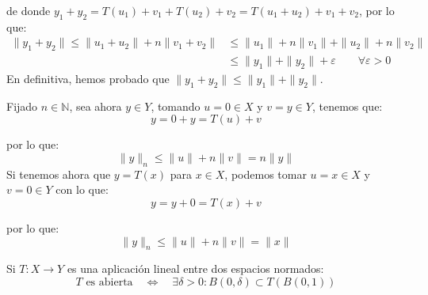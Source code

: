 \begin{ejercicio}
\begin{itemize}
\begin{equation*}
            \end{equation*}
            de donde $y_1+y_2 = T(u_1)+v_1 + T(u_2)+v_2 = T(u_1+u_2)+v_1+v_2$, por lo que:
            \begin{align*}
                \|y_1 + y_2\| \leq \|u_1+u_2\| + n\|v_1+v_2\| &\leq \|u_1\|+n\|v_1\| + \|u_2\|+n\|v_2\| \\ &\leq \|y_1\|+\|y_2\| + \varepsilon \qquad \forall \varepsilon>0
            \end{align*}
            En definitiva, hemos probado que $\|y_1+y_2\| \leq \|y_1\| + \|y_2\|$.
    \end{itemize}
    Fijado $n\in \mathbb{N}$, sea ahora $y\in Y$, tomando $u=0\in X$ y $v=y\in Y$, tenemos que:
    \begin{equation*}
        y = 0 + y = T(u) + v
    \end{equation*}

    por lo que:
    \begin{equation*}
        \|y\|_n \leq \|u\|+n\|v\| = n\|y\|
    \end{equation*}
    Si tenemos ahora que $y=T(x)$ para $x\in X$, podemos tomar $u=x\in X$ y $v=0\in Y$ con lo que:
    \begin{equation*}
        y = y + 0 = T(x) + v
    \end{equation*}

    por lo que:
    \begin{equation*}
        \|y\|_n \leq \|u\| + n\|v\| = \|x\|
    \end{equation*}
\end{ejercicio}

\begin{ejercicio} %
    Si $T:X\to Y$ es una aplicación lineal entre dos espacios normados:
    \begin{equation*}
        T \text{\ es abierta} \quad \Longleftrightarrow \quad  \exists \delta>0 : B(0,\delta)\subset T(B(0,1))
    \end{equation*}
\end{ejercicio}


